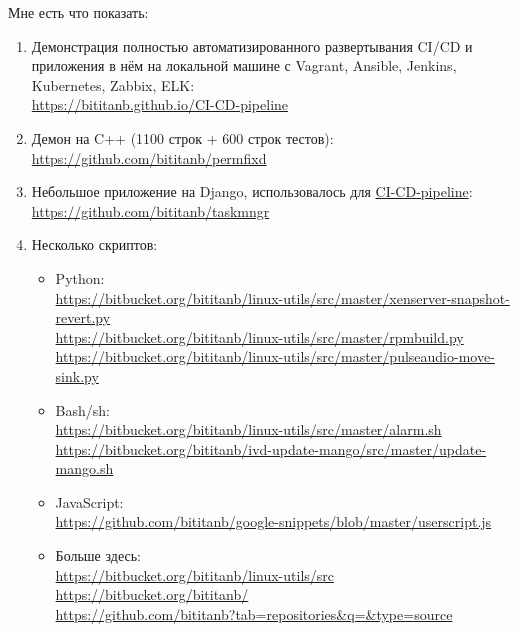 \documentclass[10pt, a4paper]{article}
\begin{document}
Мне есть что показать:
\begin{enumerate}
  \item Демонстрация полностью автоматизированного развертывания CI/CD и приложения в нём на локальной машине с Vagrant, Ansible, Jenkins, Kubernetes, Zabbix, ELK:\\
    \url{https://bititanb.github.io/CI-CD-pipeline}
  \item Демон на C++ (1100 строк + 600 строк тестов):\\
    \url{https://github.com/bititanb/permfixd}
  \item Небольшое приложение на Django, использовалось для \href{https://github.com/bititanb/CI-CD-pipeline}{CI-CD-pipeline}:\\
    \url{https://github.com/bititanb/taskmngr}
  \item Несколько скриптов:
    \begin{itemize}
      \item Python:\\
        \url{https://bitbucket.org/bititanb/linux-utils/src/master/xenserver-snapshot-revert.py}\\
        \url{https://bitbucket.org/bititanb/linux-utils/src/master/rpmbuild.py}\\
        \url{https://bitbucket.org/bititanb/linux-utils/src/master/pulseaudio-move-sink.py}
      \item Bash/sh:\\
        \url{https://bitbucket.org/bititanb/linux-utils/src/master/alarm.sh}\\
        \url{https://bitbucket.org/bititanb/ivd-update-mango/src/master/update-mango.sh}
      \item JavaScript:\\
        \url{https://github.com/bititanb/google-snippets/blob/master/userscript.js}
      \item Больше здесь:\\
        \url{https://bitbucket.org/bititanb/linux-utils/src}\\
        \url{https://bitbucket.org/bititanb/}\\
        \url{https://github.com/bititanb?tab=repositories&q=&type=source}
    \end{itemize}
\end{enumerate}
\end{document}
